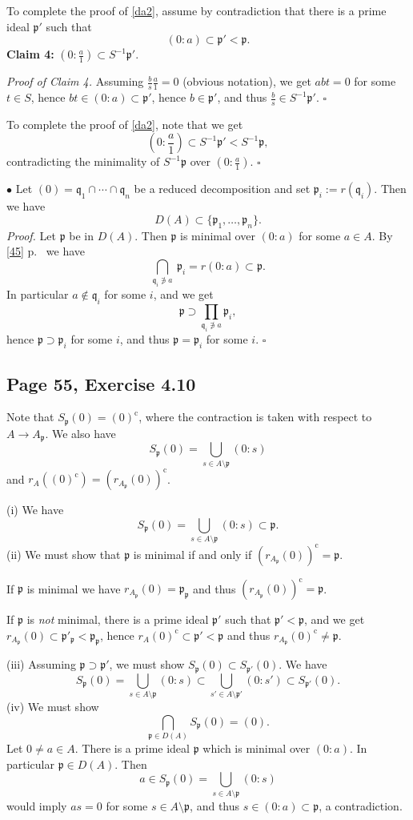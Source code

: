 \documentclass[parskip=half,fontsize=12pt]{scrartcl}%
\newcommand{\oo}{\operatorname}\newcommand{\ooo}{\operatorname*}
\newcommand{\mf}{\mathfrak}
\newcommand{\ppp}{\mf p}
\newcommand{\qqq}{\mf q}
\newcommand{\bu}{\bullet}
\begin{document}
To complete the proof of \eqref{da2}, assume by contradiction that there is a prime ideal $\ppp'$ such that 
$$
(0:a)\subset\ppp'<\ppp.
$$ 
\textbf{Claim 4:} $(0:\frac a1)\subset S^{-1}\ppp'$.

\emph{Proof of Claim 4.} Assuming $\frac bs\frac a1=0$ (obvious notation), we get $abt=0$ for some $t\in S$, hence $bt\in(0:a)\subset\ppp'$, hence $b\in\ppp'$, and thus $\frac bs\in S^{-1}\ppp'$. $\square$ 

To complete the proof of \eqref{da2}, note that we get 
$$
\left(0:\frac a1\right)\subset S^{-1}\ppp'<S^{-1}\ppp,
$$ 
contradicting the minimality of $S^{-1}\ppp$ over $(0:\frac a1)$. %
$\square$

$\bu$ Let $(0)=\qqq_1\cap\cdots\cap\qqq_n$ be a reduced decomposition and set $\ppp_i:=r(\qqq_i)$. Then we have 
$$
D(A)\subset\{\ppp_1,\dots,\ppp_n\}.
$$ 
\emph{Proof.} Let $\ppp$ be in $D(A)$. Then $\ppp$ is minimal over $(0:a)$ for some $a\in A$. By \eqref{45} p.~\pageref{45} we have 
$$
\bigcap_{\qqq_i\not\ni a}\ \ppp_i=r(0:a)\subset\ppp.
$$ 
In particular $a\notin\qqq_i$ for some $i$, and we get 
$$
\ppp\supset\prod_{\qqq_i\not\ni a}\ppp_i,
$$ 
hence $\ppp\supset\ppp_i$ for some $i$, and thus $\ppp=\ppp_i$ for some $i$. $\square$

\subsection{Page 55, Exercise 4.10}%

Note that $S_\ppp(0)=(0)^{\oo c}$, where the contraction is taken with respect to $A\to A_\ppp$. We also have 
$$
S_\ppp(0)=\bigcup_{s\in A\setminus\ppp}(0:s)
$$ 
and $r_A((0)^{\oo c})=(r_{A_\ppp}(0))^{\oo c}$.

(i) We have 
$$
S_\ppp(0)=\bigcup_{s\in A\setminus\ppp}(0:s)\subset\ppp.
$$
(ii) We must show that $\ppp$ is minimal if and only if $(r_{A_\ppp}(0))^{\oo c}=\ppp$. 

If $\ppp$ is minimal we have $r_{A_\ppp}(0)=\ppp_\ppp$ and thus $(r_{A_\ppp}(0))^{\oo c}=\ppp$. 

If $\ppp$ is \emph{not} minimal, there is a prime ideal $\ppp'$ such that $\ppp'<\ppp$, and we get $r_{A_\ppp}(0)\subset\ppp'_\ppp<\ppp_\ppp$, hence $r_A(0)^{\oo c}\subset\ppp'<\ppp$ and thus $r_{A_\ppp}(0)^{\oo c}\ne\ppp$.

(iii) Assuming $\ppp\supset\ppp'$, we must show $S_\ppp(0)\subset S_{\ppp'}(0)$. We have 
$$
S_\ppp(0)=\bigcup_{s\in A\setminus\ppp}(0:s)\subset\bigcup_{s'\in A\setminus\ppp'}(0:s')\subset S_{\ppp'}(0).
$$
(iv) We must show 
$$
\bigcap_{\ppp\in D(A)}S_\ppp(0)=(0).
$$ 
Let $0\ne a\in A$. There is a prime ideal $\ppp$ which is minimal over $(0:a)$. In particular $\ppp\in D(A)$. Then 
$$
a\in S_\ppp(0)=\bigcup_{s\in A\setminus\ppp}(0:s)
$$ 
would imply $as=0$ for some $s\in A\setminus\ppp$, and thus $s\in(0:a)\subset\ppp$, a contradiction.
\end{document}

